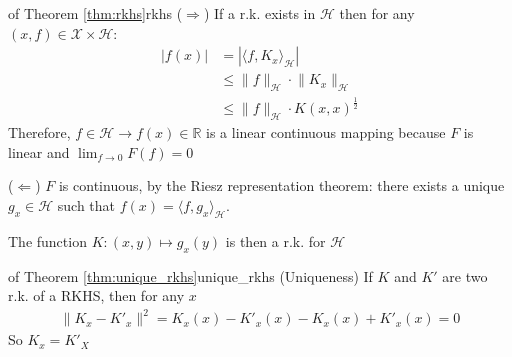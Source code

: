 \documentclass[10pt]{article}
\begin{document}
\begin{Proof}{of Theorem \ref{thm:rkhs}}{rkhs}
  ($\Rightarrow$) If a r.k. exists in $\mathcal{H}$ then for any $(x,f) \in 
  \mathcal{X} \times \mathcal{H}$:
  \begin{align*}
    |f(x)| &= |\langle f, K_x \rangle_\mathcal{H} |\\
           &\leq \lVert f \rVert_\mathcal{H} \cdot \lVert K_x \rVert_\mathcal{H}
           \tag{Cauchy-Schwarz}\\
           &\leq \lVert f \rVert_\mathcal{H} \cdot K(x,x)^\frac{1}{2}
  \end{align*}
  Therefore, $f\in\mathcal{H} \rightarrow f(x) \in \mathbb{R}$ is a linear 
  continuous mapping because $F$ is linear and $\lim_{f\rightarrow 0} F(f)= 0$

  \vspace{10pt}
  ($\Leftarrow$) $F$ is continuous, by the Riesz representation theorem: there
  exists a unique $g_x \in \mathcal{H}$ such that $f(x) = \langle f, g_x 
  \rangle_\mathcal{H}$.

  The function $K: (x, y) \mapsto g_x(y)$ is then a r.k. for $\mathcal{H}$
\end{Proof}

\begin{Proof}{of Theorem \ref{thm:unique_rkhs}}{unique_rkhs}
  (Uniqueness) If $K$ and $K'$ are two r.k. of a RKHS, then for any $x$
  \begin{align*}
    \lVert K_x - K'_x\rVert^2 = K_x(x) - K'_x(x) - K_x(x) + K'_x(x) = 0
  \end{align*}
  So $K_x = K'_X$

\end{Proof}
\end{document}

